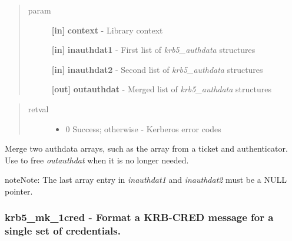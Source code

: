 \documentclass[letterpaper,10pt,english]{sphinxmanual}
\begin{document}
\begin{quote}\begin{description}
\item[{param}] \leavevmode
\textbf{{[}in{]}} \textbf{context} - Library context

\textbf{{[}in{]}} \textbf{inauthdat1} - First list of \emph{krb5\_authdata} structures

\textbf{{[}in{]}} \textbf{inauthdat2} - Second list of \emph{krb5\_authdata} structures

\textbf{{[}out{]}} \textbf{outauthdat} - Merged list of \emph{krb5\_authdata} structures

\end{description}\end{quote}
\begin{quote}\begin{description}
\item[{retval}] \leavevmode\begin{itemize}
\item {} 
0   Success; otherwise - Kerberos error codes

\end{itemize}

\end{description}\end{quote}

Merge two authdata arrays, such as the array from a ticket and authenticator. Use {\hyperref[appdev/refs/api/krb5_free_authdata:c.krb5_free_authdata]{}} to free \emph{outauthdat} when it is no longer needed.

\begin{notice}{note}{Note:}
The last array entry in \emph{inauthdat1} and \emph{inauthdat2} must be a NULL pointer.
\end{notice}


\subsubsection{krb5\_mk\_1cred -  Format a KRB-CRED message for a single set of credentials.}
\label{appdev/refs/api/krb5_mk_1cred:krb5-mk-1cred-format-a-krb-cred-message-for-a-single-set-of-credentials}\label{appdev/refs/api/krb5_mk_1cred::doc}

\begin{fulllineitems}
\label{appdev/refs/api/krb5_mk_1cred:c.krb5_mk_1cred}
\end{fulllineitems}
\end{document}
